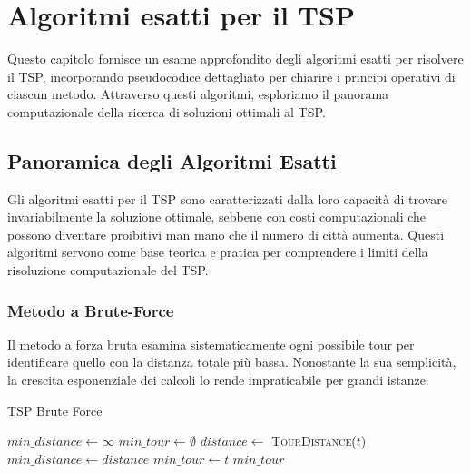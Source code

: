 
%

\makeatletter
\newcommand{\ntifpkgloaded}{%
	\@ifpackageloaded%
}
\makeatother

\chapter{Algoritmi esatti per il \gls{TSP}} \label{chapt:3}

Questo capitolo fornisce un esame approfondito degli algoritmi esatti per risolvere il \gls{TSP}, incorporando pseudocodice dettagliato per chiarire i principi operativi di ciascun metodo. Attraverso questi algoritmi, esploriamo il panorama computazionale della ricerca di soluzioni ottimali al \gls{TSP}.

\section{Panoramica degli Algoritmi Esatti}

Gli algoritmi esatti per il \gls{TSP} sono caratterizzati dalla loro capacità di trovare invariabilmente la soluzione ottimale, sebbene con costi computazionali che possono diventare proibitivi man mano che il numero di città aumenta. Questi algoritmi servono come base teorica e pratica per comprendere i limiti della risoluzione computazionale del \gls{TSP}.

\subsection{Metodo a Brute-Force}

Il metodo a forza bruta esamina sistematicamente ogni possibile tour per identificare quello con la distanza totale più bassa. Nonostante la sua semplicità, la crescita esponenziale dei calcoli lo rende impraticabile per grandi istanze.

\begin{algorithm}
	\caption{TSP Brute Force}\label{bruteforce}
	\begin{algorithmic}[1]
		\State $min\_distance \gets \infty$
		\State $min\_tour \gets \emptyset$
		\State $distance \gets$ \textsc{TourDistance}($t$)
		\State $min\_distance \gets distance$
		\State $min\_tour \gets t$
		\EndIf
		\EndFor
		\State \Return $min\_tour$
		\EndProcedure
	\end{algorithmic}
\end{algorithm}

